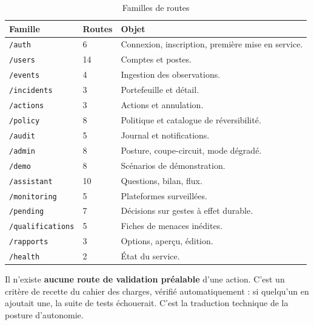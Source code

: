 \begin{table}[h]
\centering
\begin{tabular}{@{}p{4.4cm}p{1.6cm}p{7.8cm}@{}}
\toprule
\textbf{Famille} & \textbf{Routes} & \textbf{Objet} \\
\midrule
\texttt{/auth} & 6 & Connexion, inscription, première mise en service. \\
\texttt{/users} & 14 & Comptes et postes. \\
\texttt{/events} & 4 & Ingestion des observations. \\
\texttt{/incidents} & 3 & Portefeuille et détail. \\
\texttt{/actions} & 3 & Actions et annulation. \\
\texttt{/policy} & 8 & Politique et catalogue de réversibilité. \\
\texttt{/audit} & 5 & Journal et notifications. \\
\texttt{/admin} & 8 & Posture, coupe-circuit, mode dégradé. \\
\texttt{/demo} & 8 & Scénarios de démonstration. \\
\texttt{/assistant} & 10 & Questions, bilan, flux. \\
\texttt{/monitoring} & 5 & Plateformes surveillées. \\
\texttt{/pending} & 7 & Décisions sur gestes à effet durable. \\
\texttt{/qualifications} & 5 & Fiches de menaces inédites. \\
\texttt{/rapports} & 3 & Options, aperçu, édition. \\
\texttt{/health} & 2 & État du service. \\
\bottomrule
\end{tabular}
\caption{Familles de routes}
\end{table}

\begin{tcolorbox}[colback=green!4!white, colframe=darkgreen,
  title=\textbf{Bon à savoir --- ce qu'on ne trouvera pas},
  fonttitle=\bfseries, boxrule=0.6pt]
Il n'existe \textbf{aucune route de validation préalable} d'une action. C'est
un critère de recette du cahier des charges, vérifié automatiquement : si
quelqu'un en ajoutait une, la suite de tests échouerait. C'est la traduction
technique de la posture d'autonomie.
\end{tcolorbox}
